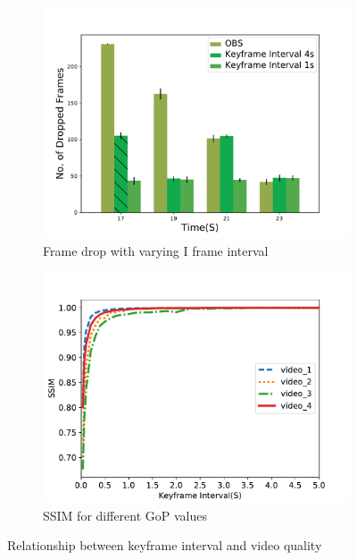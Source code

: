 \begin{figure}[htb]
\centering
\begin{subfigure}[b]{.45\columnwidth}
\centering
\includegraphics[width=\linewidth]{fig/eval_IframeInterval_drop.pdf}
\caption{Frame drop with varying I frame interval}
\label{fig:iframe-drop}
\end{subfigure}
\begin{subfigure}[b]{.45\columnwidth}
\centering
\includegraphics[width=\textwidth]{fig/ssim_gop.pdf}
\caption{SSIM for different GoP values}
\label{fig:ssim_gop}
\end{subfigure}
\caption{Relationship between keyframe interval and video quality}
\label{fig:gop}
\end{figure}

